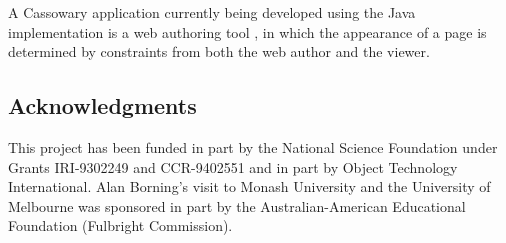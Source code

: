 \documentclass{article}
\begin{document}
A Cassowary application currently being developed using 
the Java implementation is a web authoring tool
\cite{borning-multimedia-97}, in which the appearance of a page is
determined by constraints from both the web author and the viewer.

\subsection*{Acknowledgments}

This project has been funded in part by the National Science Foundation
under Grants \mbox{IRI-9302249} and \mbox{CCR-9402551} and in part by Object
Technology International.  Alan Borning's visit to Monash University and
the University of Melbourne was sponsored in part by the
Australian-American Educational Foundation (Fulbright Commission).



\end{document}
